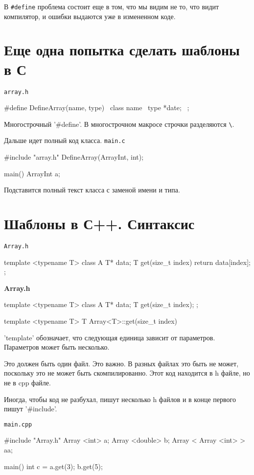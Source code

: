 В \verb'#define' проблема состоит еще в том, что мы видим не то, что видит компилятор, и ошибки выдаются уже в измененном коде.

\section{Еще одна попытка сделать шаблоны в С} 

\verb'array.h'
\begin{cppcode}
#define DefineArray(name, type) \
class name{ \
   type *date; \
};
\end{cppcode}
Многострочный \cpp'#define'. В многострочном макросе строчки разделяются \verb'\'. 

Дальше идет полный код класса. 
\verb'main.c'
\begin{cppcode}
#include "array.h"
DefineArray(ArrayInt, int);

main() {
    ArrayInt a;
}
\end{cppcode}
Подставится полный текст класса с заменой имени и типа. 

\section{Шаблоны в С++. Синтаксис}
         
\verb'Array.h'
\begin{cppcode}
template <typename T>
class A {
    T* data;
    T get(size_t index) {
        return data[index];
    }
};
\end{cppcode}

{\bf Array.h}

\begin{cppcode}
template <typename T>
class A {
    T* data;
    T get(size_t index);
};

template <typename T>
T Array<T>::get(size_t index) {

}
\end{cppcode}
\cpp'template' обозначает, что следующая единица зависит от параметров. Параметров может быть несколько. 

Это должен быть один файл.
Это важно.
В разных файлах это быть не может, поскольку это не может быть скомпилированно.
Этот код находится в h файле, но не в cpp файле.

Иногда, чтобы код не разбухал, пишут несколько h файлов и в конце первого пишут \cpp'#include'.

\verb'main.cpp'
\begin{cppcode}
#include "Array.h"
Array <int> a;
Array <double> b;
Array < Array <int> > aa; 

main() {
    int c = a.get(3);
    b.get(5);
}
\end{cppcode}

